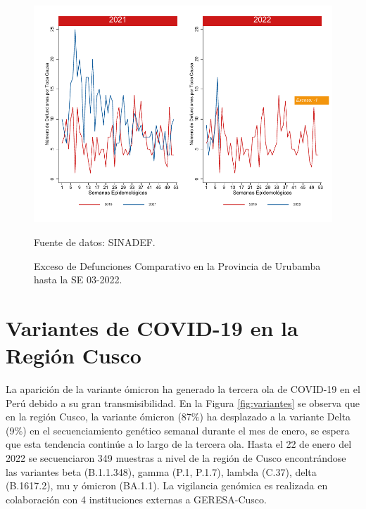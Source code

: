 \documentclass[12pt,a4paper,openany]{book}
\begin{document}
		\begin{figure}[h]
			\caption{Exceso de Defunciones Comparativo en la Provincia de Urubamba hasta la SE 03-2022.}\label{fig:exceso_urub}
			\begin{center}
				\includegraphics[width=0.7\linewidth]{../figuras/exceso_13.pdf}
			\end{center}
			{\footnotesize {Fuente de datos: SINADEF.}}
		\end{figure}
		
		\clearpage
		
		\clearpage
		
		\section* {Variantes de COVID-19 en la Región Cusco}
		\noindent La aparición de la variante ómicron ha generado la tercera ola de COVID-19 en el Perú debido a su gran transmisibilidad. En la Figura \ref{fig:variantes} se observa que en la región Cusco, la variante ómicron (87$\%$) ha desplazado a la variante Delta (9$\%$) en el secuenciamiento genético semanal durante el mes de enero, se espera que esta tendencia continúe a lo largo de la tercera ola. 
		Hasta el 22 de enero del 2022 se secuenciaron 349 muestras a nivel de la región de Cusco 
		encontrándose las variantes beta (B.1.1.348), gamma (P.1, P.1.7), lambda (C.37), delta (B.1617.2), mu y ómicron (BA.1.1). 
		La vigilancia genómica es realizada en colaboración con 4 instituciones externas a GERESA-Cusco.
						
\end{document}
